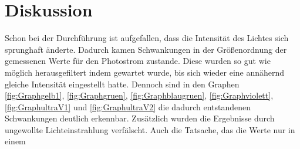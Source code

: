 
\section{Diskussion}
\label{sec:Diskussion}

Schon bei der Durchführung ist aufgefallen, dass die Intensität des Lichtes sich sprunghaft änderte. Dadurch kamen Schwankungen in der Größenordnung der gemessenen Werte für den Photostrom zustande. Diese wurden so gut wie möglich herausgefiltert indem gewartet wurde, bis sich wieder eine annähernd gleiche Intensität eingestellt hatte. Dennoch sind in den Graphen \ref{fig:Graphgelb1}, \ref{fig:Graphgruen}, \ref{fig:Graphblaugruen}, \ref{fig:Graphviolett}, \ref{fig:GraphultraV1} und \ref{fig:GraphultraV2} die dadurch entstandenen Schwankungen deutlich erkennbar. Zusätzlich wurden die Ergebnisse durch ungewollte Lichteinstrahlung verfälscht. Auch die Tatsache, das die Werte nur in einem 
